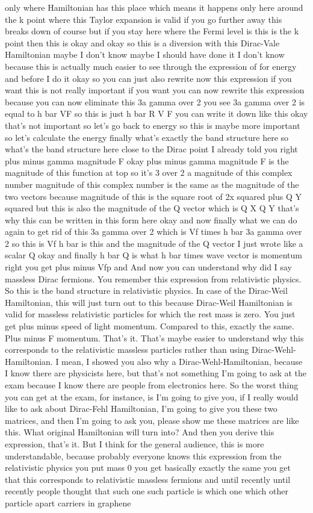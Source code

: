only where Hamiltonian has this place which means it happens only here around the k point where this Taylor expansion is valid if you go further away this breaks down of course but if you stay here where the Fermi level is this is the k point then this is okay and okay so this is a diversion with this Dirac-Vale Hamiltonian maybe I don't know maybe I should have done it I don't know because this is actually much easier to see through the expression of for energy and before I do it okay so you can just also rewrite now this expression if you want this is not really important if you want you can now rewrite this expression because you can now eliminate this 3a gamma over 2 you see 3a gamma over 2 is equal to h bar VF so this is just h bar R V F you can write it down like this okay that's not important so let's go back to energy so this is maybe more important so let's calculate the energy finally what's exactly the band structure here so what's the band structure here close to the Dirac point I already told you right plus minus gamma magnitude F okay plus minus gamma magnitude F is the magnitude of this function at top so it's 3 over 2 a magnitude of this complex number magnitude of this complex number is the same as the magnitude of the two vectors because magnitude of this is the square root of 2x squared plus Q Y squared but this is also the magnitude of the Q vector which is Q X Q Y that's why this can be written in this form here okay and now finally what we can do again to get rid of this 3a gamma over 2 which is Vf times h bar 3a gamma over 2 so this is Vf h bar is this and the magnitude of the Q vector I just wrote like a scalar Q okay and finally h bar Q is what h bar times wave vector is momentum right you get plus minus Vfp and And now you can understand why did I say massless Dirac fermions. You remember this expression from relativistic physics. So this is the band structure in relativistic physics. In case of the Dirac-Weil Hamiltonian, this will just turn out to this because Dirac-Weil Hamiltonian is valid for massless relativistic particles for which the rest mass is zero. You just get plus minus speed of light momentum. Compared to this, exactly the same. Plus minus F momentum. That's it. That's maybe easier to understand why this corresponds to the relativistic massless particles rather than using Dirac-Wehl-Hamiltonian. I mean, I showed you also why a Dirac-Wehl-Hamiltonian, because I know there are physicists here, but that's not something I'm going to ask at the exam because I know there are people from electronics here. So the worst thing you can get at the exam, for instance, is I'm going to give you, if I really would like to ask about Dirac-Fehl Hamiltonian, I'm going to give you these two matrices, and then I'm going to ask you, please show me these matrices are like this. What original Hamiltonian will turn into? And then you derive this expression, that's it. But I think for the general audience, this is more understandable, because probably everyone knows this expression from the relativistic physics you put mass 0 you get basically exactly the same you get that this corresponds to relativistic massless fermions and until recently until recently people thought that such one such particle is which one which other particle apart carriers in graphene 